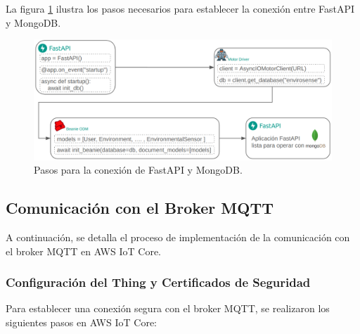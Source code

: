 La figura \ref{fig:conexion mongo} ilustra los pasos necesarios para establecer
la conexión entre FastAPI y MongoDB.

\begin{figure}[H]
    \centering
    \includegraphics[width=.87\textwidth]{./Images/19.png}
    \caption{Pasos para la conexión de FastAPI y MongoDB.}
    \label{fig:conexion mongo}
\end{figure}

\subsection{Comunicación con el Broker MQTT}

A continuación, se detalla el proceso de implementación de la comunicación con
el broker MQTT en AWS IoT Core.

\subsubsection{Configuración del Thing y Certificados de Seguridad}

Para establecer una conexión segura con el broker MQTT, se realizaron los
siguientes pasos en AWS IoT Core:

